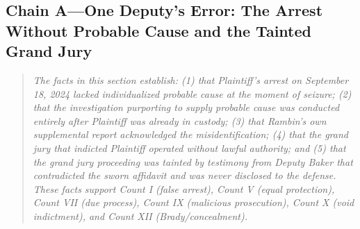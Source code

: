 \documentclass[12pt,letterpaper]{article}
\begin{document}
	\subsection*{Chain A---One Deputy's Error: The Arrest Without Probable Cause and the Tainted Grand Jury}
	\begin{quote}
		\textit{The facts in this section establish: (1) that Plaintiff's
			arrest on September 18, 2024 lacked individualized probable
			cause at the moment of seizure; (2) that the investigation
			purporting to supply probable cause was conducted entirely
			after Plaintiff was already in custody; (3) that Rambin's own
			supplemental report acknowledged the misidentification;
			(4) that the grand jury that indicted Plaintiff operated
			without lawful authority; and (5) that the grand jury
			proceeding was tainted by testimony from Deputy Baker that
			contradicted the sworn affidavit and was never disclosed to the
			defense. These facts support Count I (false arrest), Count V
			(equal protection), Count VII (due process), Count IX
			(malicious prosecution), Count X (void indictment), and
			Count XII (Brady/concealment).}
	\end{quote}
\end{document}
